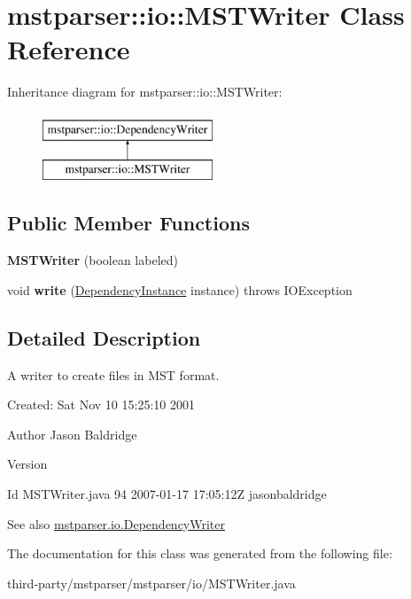 \hypertarget{classmstparser_1_1io_1_1MSTWriter}{
\section{mstparser::io::MSTWriter Class Reference}
\label{classmstparser_1_1io_1_1MSTWriter}
}
Inheritance diagram for mstparser::io::MSTWriter:\begin{figure}[H]
\begin{center}
\leavevmode
\includegraphics[height=2cm]{classmstparser_1_1io_1_1MSTWriter}
\end{center}
\end{figure}
\subsection*{Public Member Functions}
\begin{DoxyCompactItemize}
\item 
\hypertarget{classmstparser_1_1io_1_1MSTWriter_a500797160d56d2863026ec35833d0466}{
{\bfseries MSTWriter} (boolean labeled)}
\label{classmstparser_1_1io_1_1MSTWriter_a500797160d56d2863026ec35833d0466}

\item 
\hypertarget{classmstparser_1_1io_1_1MSTWriter_a71b36b42ff310deff9248b38722ef009}{
void {\bfseries write} (\hyperlink{classmstparser_1_1DependencyInstance}{DependencyInstance} instance)  throws IOException }
\label{classmstparser_1_1io_1_1MSTWriter_a71b36b42ff310deff9248b38722ef009}

\end{DoxyCompactItemize}


\subsection{Detailed Description}
A writer to create files in MST format.

Created: Sat Nov 10 15:25:10 2001 

\begin{DoxyAuthor}{Author}
Jason Baldridge 
\end{DoxyAuthor}
\begin{DoxyVersion}{Version}

\end{DoxyVersion}
\begin{DoxyParagraph}{Id}
MSTWriter.java 94 2007-\/01-\/17 17:05:12Z jasonbaldridge 
\end{DoxyParagraph}
\begin{DoxySeeAlso}{See also}
\hyperlink{classmstparser_1_1io_1_1DependencyWriter}{mstparser.io.DependencyWriter} 
\end{DoxySeeAlso}


The documentation for this class was generated from the following file:\begin{DoxyCompactItemize}
\item 
third-\/party/mstparser/mstparser/io/MSTWriter.java\end{DoxyCompactItemize}
